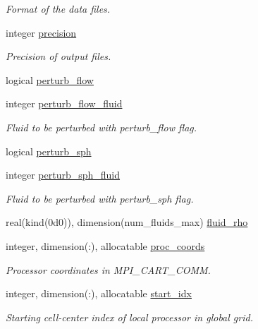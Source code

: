\begin{DoxyCompactItemize}
\begin{DoxyCompactList}\small\item\em Format of the data files. \end{DoxyCompactList}\item 
integer \hyperlink{namespacem__global__parameters_a6ed5e5561c16f30a4010f6612877029d}{precision}
\begin{DoxyCompactList}\small\item\em Precision of output files. \end{DoxyCompactList}\item 
logical \hyperlink{namespacem__global__parameters_add2d4033abdced8536200ef739ab379b}{perturb\+\_\+flow}
\item 
integer \hyperlink{namespacem__global__parameters_a1c242fb70db5a2c91c0997b37bcffd6a}{perturb\+\_\+flow\+\_\+fluid}
\begin{DoxyCompactList}\small\item\em Fluid to be perturbed with perturb\+\_\+flow flag. \end{DoxyCompactList}\item 
logical \hyperlink{namespacem__global__parameters_a98ddabe1c45996064589ca24ce5d8fe3}{perturb\+\_\+sph}
\item 
integer \hyperlink{namespacem__global__parameters_a90f36c0b74894ddd901534dd4efccfc8}{perturb\+\_\+sph\+\_\+fluid}
\begin{DoxyCompactList}\small\item\em Fluid to be perturbed with perturb\+\_\+sph flag. \end{DoxyCompactList}\item 
real(kind(0d0)), dimension(num\+\_\+fluids\+\_\+max) \hyperlink{namespacem__global__parameters_a3bde8cf1ea00471fcd005219c55e824e}{fluid\+\_\+rho}
\item 
integer, dimension(\+:), allocatable \hyperlink{namespacem__global__parameters_a48dea2bc17c5e4465a444c926070ae9b}{proc\+\_\+coords}
\begin{DoxyCompactList}\small\item\em Processor coordinates in M\+P\+I\+\_\+\+C\+A\+R\+T\+\_\+\+C\+O\+MM. \end{DoxyCompactList}\item 
integer, dimension(\+:), allocatable \hyperlink{namespacem__global__parameters_a4bd117ae744eab60f3d681fd03d6e90d}{start\+\_\+idx}
\begin{DoxyCompactList}\small\item\em Starting cell-\/center index of local processor in global grid. \end{DoxyCompactList}\item 

\end{DoxyCompactItemize}

